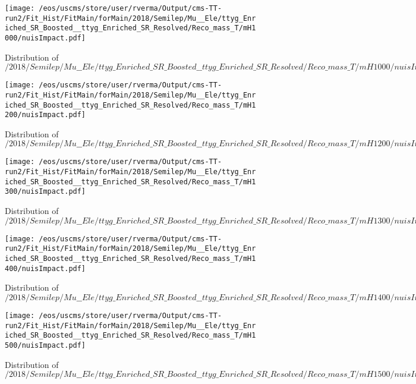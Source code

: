 \begin{figure}
\centering
\texttt{[image: /eos/uscms/store/user/rverma/Output/cms-TT-run2/Fit\_Hist/FitMain/forMain/2018/Semilep/Mu\_\_Ele/ttyg\_Enriched\_SR\_Boosted\_\_ttyg\_Enriched\_SR\_Resolved/Reco\_mass\_T/mH1000/nuisImpact.pdf]}
\caption{Distribution of $/2018/Semilep/Mu\_\_Ele/ttyg\_Enriched\_SR\_Boosted\_\_ttyg\_Enriched\_SR\_Resolved/Reco\_mass\_T/mH1000/nuisImpact.pdf$}
\end{figure}

\begin{figure}
\centering
\texttt{[image: /eos/uscms/store/user/rverma/Output/cms-TT-run2/Fit\_Hist/FitMain/forMain/2018/Semilep/Mu\_\_Ele/ttyg\_Enriched\_SR\_Boosted\_\_ttyg\_Enriched\_SR\_Resolved/Reco\_mass\_T/mH1200/nuisImpact.pdf]}
\caption{Distribution of $/2018/Semilep/Mu\_\_Ele/ttyg\_Enriched\_SR\_Boosted\_\_ttyg\_Enriched\_SR\_Resolved/Reco\_mass\_T/mH1200/nuisImpact.pdf$}
\end{figure}

\begin{figure}
\centering
\texttt{[image: /eos/uscms/store/user/rverma/Output/cms-TT-run2/Fit\_Hist/FitMain/forMain/2018/Semilep/Mu\_\_Ele/ttyg\_Enriched\_SR\_Boosted\_\_ttyg\_Enriched\_SR\_Resolved/Reco\_mass\_T/mH1300/nuisImpact.pdf]}
\caption{Distribution of $/2018/Semilep/Mu\_\_Ele/ttyg\_Enriched\_SR\_Boosted\_\_ttyg\_Enriched\_SR\_Resolved/Reco\_mass\_T/mH1300/nuisImpact.pdf$}
\end{figure}

\begin{figure}
\centering
\texttt{[image: /eos/uscms/store/user/rverma/Output/cms-TT-run2/Fit\_Hist/FitMain/forMain/2018/Semilep/Mu\_\_Ele/ttyg\_Enriched\_SR\_Boosted\_\_ttyg\_Enriched\_SR\_Resolved/Reco\_mass\_T/mH1400/nuisImpact.pdf]}
\caption{Distribution of $/2018/Semilep/Mu\_\_Ele/ttyg\_Enriched\_SR\_Boosted\_\_ttyg\_Enriched\_SR\_Resolved/Reco\_mass\_T/mH1400/nuisImpact.pdf$}
\end{figure}

\begin{figure}
\centering
\texttt{[image: /eos/uscms/store/user/rverma/Output/cms-TT-run2/Fit\_Hist/FitMain/forMain/2018/Semilep/Mu\_\_Ele/ttyg\_Enriched\_SR\_Boosted\_\_ttyg\_Enriched\_SR\_Resolved/Reco\_mass\_T/mH1500/nuisImpact.pdf]}
\caption{Distribution of $/2018/Semilep/Mu\_\_Ele/ttyg\_Enriched\_SR\_Boosted\_\_ttyg\_Enriched\_SR\_Resolved/Reco\_mass\_T/mH1500/nuisImpact.pdf$}
\end{figure}

